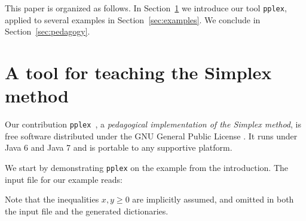 \documentclass[ukenglish,a4]{article}
\begin{document}
This paper is organized as follows.
In Section~\ref{sec:pplex} we introduce 
our tool \texttt{pplex}, applied to several examples in Section~\ref{sec:examples}.
We conclude in Section~\ref{sec:pedagogy}.

\section{A tool for teaching the Simplex method}\label{sec:pplex}
Our contribution \texttt{pplex}~\cite{pplex},
a \emph{pedagogical implementation of the Simplex method},
is free software distributed under the GNU General Public License \cite{GNUGPL}.
It runs under Java 6 and Java 7 and is portable to any supportive platform.

We start by demonstrating \texttt{pplex} on the example from the introduction.
The input file for our example reads:
\begin{alltt}

\end{alltt}
Note that the inequalities $x,y \geq 0$ are implicitly assumed, and omitted in both the input file and the generated dictionaries.
\end{document}
